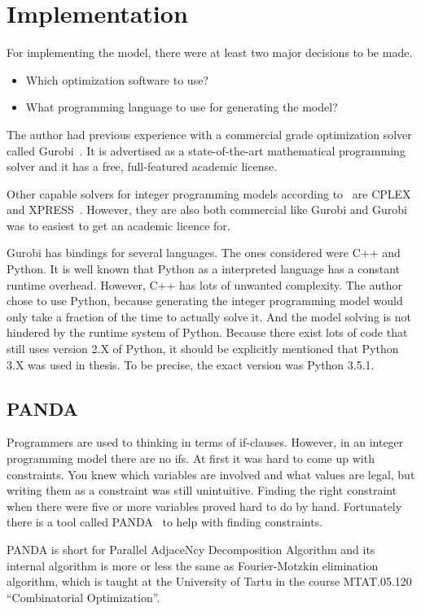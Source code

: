 \section{Implementation}
For implementing the model, there were at least two major decisions to be made.
\begin{itemize}
    \item Which optimization software to use?
    \item What programming language to use for generating the model?
\end{itemize}
The author had previous experience with a commercial grade optimization solver
called Gurobi~\cite{gurobi}. It is advertised as a state-of-the-art
mathematical programming solver and it has a free, full-featured academic
license.

Other capable solvers for integer programming models according
to~\cite{meindl2012analysis,mittleman} are CPLEX~\cite{cplex} and XPRESS~\cite{xpress}.
However, they are also both commercial like Gurobi and Gurobi was to easiest to
get an academic licence for.

Gurobi has bindings for several languages. The ones considered were C++ and
Python. It is well known that Python as a interpreted language has a constant
runtime overhead. However, C++ has lots of unwanted complexity. The author
chose to use Python, because generating the integer programming model would
only take a fraction of the time to actually solve it. And the model solving
is not hindered by the runtime system of Python. Because there exist lots of
code that still uses version 2.X of Python, it should be explicitly
mentioned that Python 3.X was used in thesis. To be precise, the exact version
was Python 3.5.1.
\subsection{PANDA}
Programmers are used to thinking in terms of if-clauses. However, in an integer
programming model there are no ifs. At first it was hard to come up with
constraints. You knew which variables are involved and what values are legal,
but writing them as a constraint was still unintuitive. Finding the right
constraint when there were five or more variables proved hard to do by
hand. Fortunately there is a tool called PANDA~\cite{panda} to help with
finding constraints.

PANDA is short for Parallel AdjaceNcy Decomposition Algorithm and its internal
algorithm is more or less the same as Fourier-Motzkin elimination algorithm,
which is taught at the University of Tartu in the course MTAT.05.120
``Combinatorial Optimization''.

